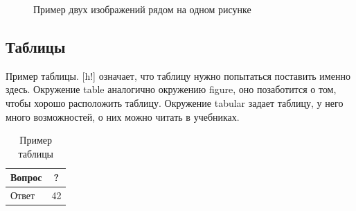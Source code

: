 \documentclass[russian]{lecture-notes}
\begin{document}
\begin{figure}[h!]
\begin{subfigure}[t]{50mm}
        \label{fig:example-2b}
    \end{subfigure}
    \caption{Пример двух изображений рядом на одном рисунке}
    \label{fig:example-2}
\end{figure}


\subsection{Таблицы}

Пример таблицы. [h!] означает, что таблицу нужно попытаться поставить именно здесь. Окружение
table аналогично окружению figure, оно позаботится о том, чтобы хорошо расположить таблицу.
Окружение tabular задает таблицу, у него много возможностей, о них можно читать в учебниках.
\begin{table}[h!]
    \centering
    \caption{Пример таблицы}
    \label{tab:example1}
    \begin{tabular}{|p{5cm}|c|}
        \hline
        \centering
        Вопрос & ? \\
        \hline
        Ответ & 42 \\
        \hline
    \end{tabular}
\end{table}
\end{document}
